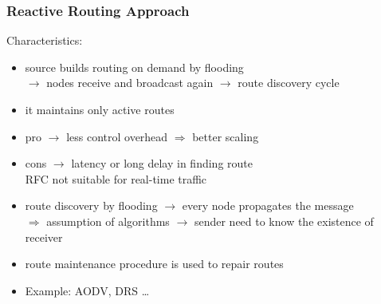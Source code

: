 \subsubsection{Reactive Routing Approach}
Characteristics:
\begin{itemize}
    \item source builds routing on demand by flooding\\$\rightarrow$ nodes receive and broadcast again $\rightarrow$ route discovery cycle
    \item it maintains only active routes
    \item pro $\rightarrow$ less control overhead $\Rightarrow$ better scaling
    \item cons $\rightarrow$ latency or long delay in finding route\\
    RFC not suitable for real-time traffic
    \item route discovery by flooding $\rightarrow$ every node propagates the message\\
    $\Rightarrow$ assumption of algorithms $\rightarrow$ sender need to know the existence of receiver
    \item route maintenance procedure is used to repair routes
    \item Example: AODV, DRS \dots
\end{itemize}

